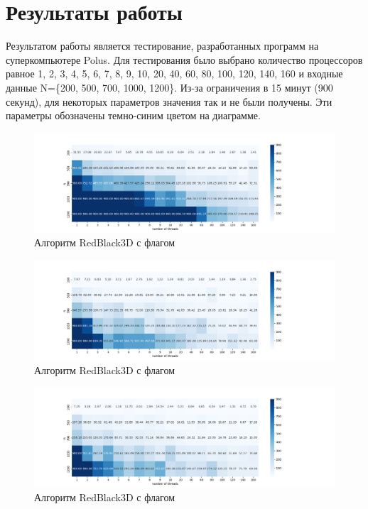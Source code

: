 \section{Результаты работы}

Результатом работы является тестирование, разработанных программ на суперкомпьютере Polus. Для тестирования было выбрано количество процессоров равное 1, 2, 3, 4, 5, 6, 7, 8, 9, 10, 20, 40, 60, 80, 100, 120, 140, 160 и входные данные N=\{200, 500, 700, 1000, 1200\}.
Из-за ограничения в 15 минут (900 секунд), для некоторых параметров значения так и не были получены. Эти параметры обозначены темно-синим цветом на диаграмме.


\begin{figure}[H]
    \centering
    \includegraphics[width=1.\linewidth,center]{openmp_redblack_O0.png}
    \caption{Алгоритм RedBlack3D с флагом }
\end{figure}

\begin{figure}[H]
    \centering
    \includegraphics[width=1.\linewidth,center]{openmp_redblack_O2.png}
    \caption{Алгоритм RedBlack3D с флагом }
\end{figure}

\begin{figure}[H]
    \centering
    \includegraphics[width=1.\linewidth,center]{openmp_redblack_O3.png}
    \caption{Алгоритм RedBlack3D с флагом }
\end{figure}


